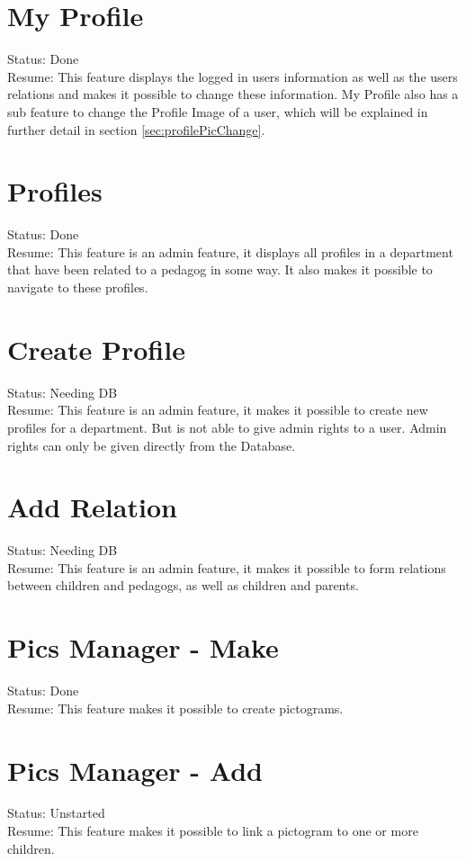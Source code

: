 \section{My Profile}
Status: Done\\
Resume: This feature displays the logged in users information as well as the users relations and makes it possible to change these information. My Profile also has a sub feature to change the Profile Image of a user, which will be explained in further detail in section \vref{sec:profilePicChange}.

\section{Profiles}
Status: Done\\
Resume: This feature is an admin feature, it displays all profiles in a department that have been related to a pedagog in some way. It also makes it possible to navigate to these profiles.

\section{Create Profile}
Status: Needing DB\\
Resume: This feature is an admin feature, it makes it possible to create new profiles for a department. But is not able to give admin rights to a user. Admin rights can only be given directly from the Database.

\section{Add Relation}
Status: Needing DB\\
Resume: This feature is an admin feature, it makes it possible to form relations between children and pedagogs, as well as children and parents.

\section{Pics Manager - Make}
Status: Done\\
Resume: This feature makes it possible to create pictograms.

\section{Pics Manager - Add}
Status: Unstarted\\
Resume: This feature makes it possible to link a pictogram to one or more children.

